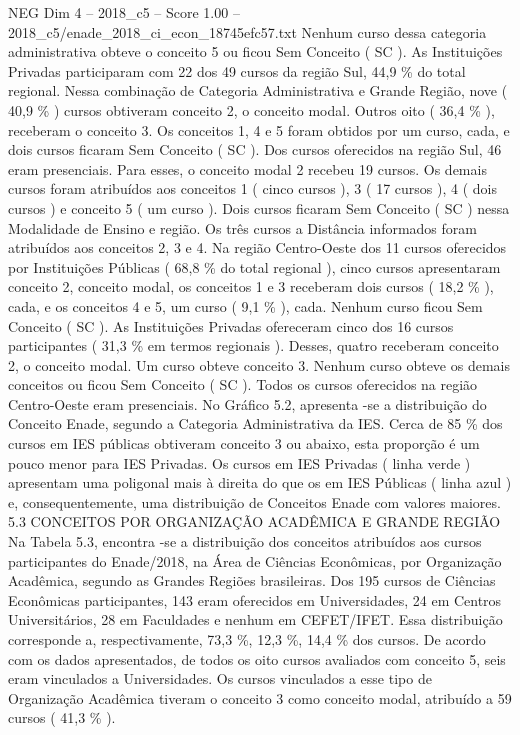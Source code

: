 \begin{textsample}{NEG Dim 4 – 2018\_c5 – Score 1.00 – 2018\_c5/enade\_2018\_ci\_econ\_18745efc57.txt}
Nenhum curso dessa categoria administrativa obteve o conceito 5 ou ficou Sem Conceito ( SC ).
As Instituições Privadas participaram com 22 dos 49 cursos da região Sul, 44,9 \% do total regional.
Nessa combinação de Categoria Administrativa e Grande Região, nove ( 40,9 \% ) cursos obtiveram conceito 2, o conceito modal.
Outros oito ( 36,4 \% ), receberam o conceito 3.
Os conceitos 1, 4 e 5 foram obtidos por um curso, cada, e dois cursos ficaram Sem Conceito ( SC ).
Dos cursos oferecidos na região Sul, 46 eram presenciais.
Para esses, o conceito modal 2 recebeu 19 cursos.
Os demais cursos foram atribuídos aos conceitos 1 ( cinco cursos ), 3 ( 17 cursos ), 4 ( dois cursos ) e conceito 5 ( um curso ).
Dois cursos ficaram Sem Conceito ( SC ) nessa Modalidade de Ensino e região.
Os três cursos a Distância informados foram atribuídos aos conceitos 2, 3 e 4.
Na região Centro-Oeste dos 11 cursos oferecidos por Instituições Públicas ( 68,8 \% do total regional ), cinco cursos apresentaram conceito 2, conceito modal, os conceitos 1 e 3 receberam dois cursos ( 18,2 \% ), cada, e os conceitos 4 e 5, um curso ( 9,1 \% ), cada.
Nenhum curso ficou Sem Conceito ( SC ).
As Instituições Privadas ofereceram cinco dos 16 cursos participantes ( 31,3 \% em termos regionais ).
Desses, quatro receberam conceito 2, o conceito modal.
Um curso obteve conceito 3.
Nenhum curso obteve os demais conceitos ou ficou Sem Conceito ( SC ).
Todos os cursos oferecidos na região Centro-Oeste eram presenciais.
No Gráfico 5.2, apresenta -se a distribuição do Conceito Enade, segundo a Categoria Administrativa da IES.
Cerca de 85 \% dos cursos em IES públicas obtiveram conceito 3 ou abaixo, esta proporção é um pouco menor para IES Privadas.
Os cursos em IES Privadas ( linha verde ) apresentam uma poligonal mais à direita do que os em IES Públicas ( linha azul ) e, consequentemente, uma distribuição de Conceitos Enade com valores maiores. 5.3 CONCEITOS POR ORGANIZAÇÃO ACADÊMICA E GRANDE REGIÃO Na Tabela 5.3, encontra -se a distribuição dos conceitos atribuídos aos cursos participantes do Enade/2018, na Área de Ciências Econômicas, por Organização Acadêmica, segundo as Grandes Regiões brasileiras.
Dos 195 cursos de Ciências Econômicas participantes, 143 eram oferecidos em Universidades, 24 em Centros Universitários, 28 em Faculdades e nenhum em CEFET/IFET.
Essa distribuição corresponde a, respectivamente, 73,3 \%, 12,3 \%, 14,4 \% dos cursos.
De acordo com os dados apresentados, de todos os oito cursos avaliados com conceito 5, seis eram vinculados a Universidades.
Os cursos vinculados a esse tipo de Organização Acadêmica tiveram o conceito 3 como conceito modal, atribuído a 59 cursos ( 41,3 \% ).

\end{textsample}
